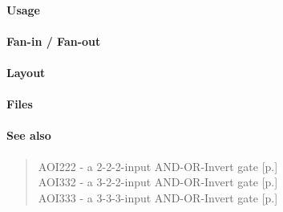 \paragraph{Usage}

\paragraph{Fan-in / Fan-out}

\paragraph{Layout}

\paragraph{Files}

\paragraph{See also}
\begin{quote}
    AOI222 - a 2-2-2-input AND-OR-Invert gate [p.\pageref{AOI222}] \\
    AOI332 - a 3-2-2-input AND-OR-Invert gate [p.\pageref{AOI332}] \\
    AOI333 - a 3-3-3-input AND-OR-Invert gate [p.\pageref{AOI333}]
\end{quote}
